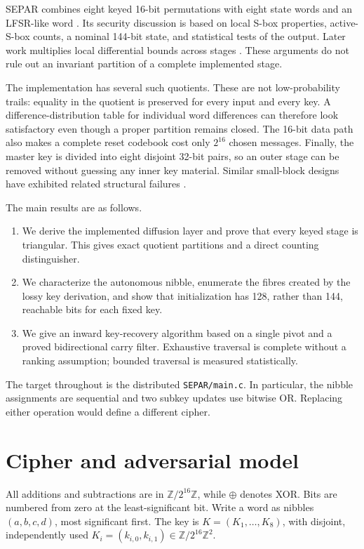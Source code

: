 \documentclass[10pt]{article}
\theoremstyle{plain}
\theoremstyle{definition}
\theoremstyle{remark}
\newcommand{\W}{\mathbb Z/2^{16}\mathbb Z}
\newcommand{\xor}{\mathbin{\oplus}}
\newcommand{\code}[1]{\texttt{#1}}
\begin{document}
SEPAR combines eight keyed 16-bit permutations with eight state words and an
LFSR-like word \cite{VahiJassbi2020}.  Its security discussion is based on
local S-box properties, active-S-box counts, a nominal 144-bit state, and
statistical tests of the output.  Later work multiplies local differential
bounds across stages \cite{VahiMirnia2021,VahiMirnia2025}.  These arguments do
not rule out an invariant partition of a complete implemented stage.

The implementation has several such quotients.  These are not low-probability
trails: equality in the quotient is preserved for every input and every key.
A difference-distribution table for individual word differences can therefore
look satisfactory even though a proper partition remains closed.  The
16-bit data path also makes a complete reset codebook cost only \(2^{16}\)
chosen messages.  Finally, the master key is divided into eight disjoint
32-bit pairs, so an outer stage can be removed without guessing any inner key
material.  Similar small-block designs have exhibited related structural
failures \cite{Saarinen2011}.

The main results are as follows.
\begin{enumerate}
\item We derive the implemented diffusion layer and prove that every keyed
stage is triangular.  This gives exact quotient partitions and a direct
counting distinguisher.
\item We characterize the autonomous nibble, enumerate the fibres created by
the lossy key derivation, and show that initialization has 128, rather than
144, reachable bits for each fixed key.
\item We give an inward key-recovery algorithm based on a single pivot and a
proved bidirectional carry filter.  Exhaustive traversal is complete without
a ranking assumption; bounded traversal is measured statistically.
\end{enumerate}

The target throughout is the distributed \code{SEPAR/main.c}.  In particular,
the nibble assignments are sequential and two subkey updates use bitwise OR.
Replacing either operation would define a different cipher.

\section{Cipher and adversarial model}
\label{sec:model}

All additions and subtractions are in \(\W\), while \(\xor\) denotes XOR.
Bits are numbered from zero at the least-significant bit.  Write a word as
nibbles \((a,b,c,d)\), most significant first.  The key is
\(K=(K_1,\ldots,K_8)\), with disjoint, independently used
\(K_i=(k_{i,0},k_{i,1})\in\W^2\).
\end{document}

